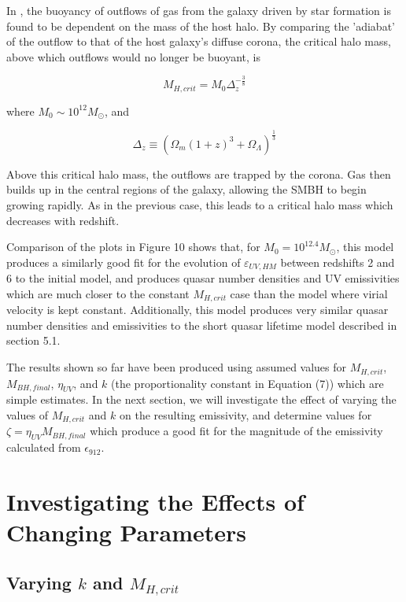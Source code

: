 \documentclass[12pt, twocolumn]{report}%
\begin{document}
In \cite{Quasar}, the buoyancy of outflows of gas from the galaxy driven by star formation is found to be dependent on the mass of the host halo. By comparing the 'adiabat' of the outflow to that of the host galaxy's diffuse corona, the critical halo mass, above which outflows would no longer be buoyant, is

\begin{equation}
    M_{H,crit}=M_0\Delta_z^{-\frac{3}{8}}
\end{equation}

\noindent where $M_0\sim10^{12}M_\odot$, and

\begin{equation}
    \Delta_z\equiv(\Omega_m(1+z)^3+\Omega_\Lambda)^{\frac{1}{3}}
\end{equation}

\noindent Above this critical halo mass, the outflows are trapped by the corona. Gas then builds up in the central regions of the galaxy, allowing the SMBH to begin growing rapidly. As in the previous case, this leads to a critical halo mass which decreases with redshift.\par

Comparison of the plots in Figure 10 shows that, for $M_0=10^{12.4}M_\odot$, this model produces a similarly good fit for the evolution of $\varepsilon_{UV,HM}$ between redshifts 2 and 6 to the initial model, and produces quasar number densities and UV emissivities which are much closer to the constant $M_{H,crit}$ case than the model where virial velocity is kept constant. Additionally, this model produces very similar quasar number densities and emissivities to the short quasar lifetime model described in section 5.1.

 The results shown so far have been produced using assumed values for $M_{H,crit}$, $M_{BH,final}$, $\eta_{UV}$, and $k$ (the proportionality constant in Equation (7)) which are simple estimates. In the next section, we will investigate the effect of varying the values of $M_{H,crit}$ and $k$ on the resulting emissivity, and determine values for $\zeta=\eta_{UV}M_{BH,final}$ which produce a good fit for the magnitude of the emissivity calculated from $\epsilon_{912}$.

 \section{Investigating the Effects of Changing Parameters}
 \subsection{Varying $k$ and $M_{H,crit}$}
\end{document}
